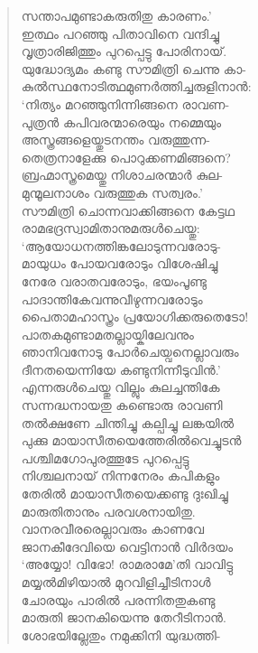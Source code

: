 \begin{verse}
സന്താപമുണ്ടാകരുതിതു കാരണം.’\\
ഇത്ഥം പറഞ്ഞു പിതാവിനെ വന്ദിച്ചു\\
വൃത്രാരിജിത്തും പുറപ്പെട്ടു പോരിനായ്.\\
യുദ്ധോദ്യമം കണ്ടു സൗമിത്രി ചെന്നു കാ-\\
കുല്‍സ്ഥനോടിത്ഥമുണര്‍ത്തിച്ചരുളിനാന്‍:\\
‘നിത്യം മറഞ്ഞുനിന്നിങ്ങനെ രാവണ-\\
പുത്രന്‍ കപിവരന്മാരെയും നമ്മെയും\\
അസ്ത്രങ്ങളെയ്തുടനന്തം വരുത്തുന്ന-\\
തെത്രനാളേക്കു പൊറുക്കണമിങ്ങനെ?\\
ബ്രഹ്മാസ്ത്രമെയ്തു നിശാചരന്മാര്‍ കുല-\\
മുന്മൂലനാശം വരുത്തുക സത്വരം.’\\
സൗമിത്രി ചൊന്നവാക്കിങ്ങനെ കേട്ടഥ\\
രാമഭദ്രസ്വാമിതാനുമരുള്‍ചെയ്തു:\\
‘ആയോധനത്തിങ്കലോടുന്നവരോടു-\\
മായുധം പോയവരോടും വിശേഷിച്ചു\\
നേരേ വരാതവരോടും, ഭയംപൂണ്ടു\\
പാദാന്തികേവന്നുവീഴുന്നവരോടും\\
പൈതാമഹാസ്ത്രം പ്രയോഗിക്കരുതെടോ!\\
പാതകമുണ്ടാമതല്ലായ്കിലേവനും\\
ഞാനിവനോടു പോര്‍ചെയ്വനെല്ലാവരും\\
ദീനതയെന്നിയേ കണ്ടുനിന്നീടുവിന്‍.’\\
എന്നരുള്‍ചെയ്തു വില്ലും കുലച്ചന്തികേ\\
സന്നദ്ധനായതു കണ്ടൊരു രാവണി\\
തല്‍ക്ഷണേ ചിന്തിച്ചു കല്പിച്ചു ലങ്കയില്‍\\
പുക്കു മായാസീതയെത്തേരില്‍വെച്ചുടന്‍\\
പശ്ചിമഗോപുരത്തൂടേ പുറപ്പെട്ടു\\
നിശ്ചലനായ് നിന്നനേരം കപികളും\\
തേരില്‍ മായാസീതയെക്കണ്ടു ദുഃഖിച്ചു\\
മാരുതിതാനും പരവശനായിതു.\\
വാനരവീരരെല്ലാവരും കാണവേ\\
ജാനകീദേവിയെ വെട്ടിനാന്‍ വിര്‍ദയം\\
‘അയ്യോ! വിഭോ! രാമരാമേ’തി വാവിട്ടു\\
മയ്യല്‍മിഴിയാല്‍ മുറവിളിച്ചീടിനാള്‍\\
ചോരയും പാരില്‍ പരന്നിതതുകണ്ടു\\
മാരുതി ജാനകിയെന്നു തേറീടിനാന്‍.\\
ശോഭയില്ലേതും നമുക്കിനി യുദ്ധത്തി-\\

\end{verse}
